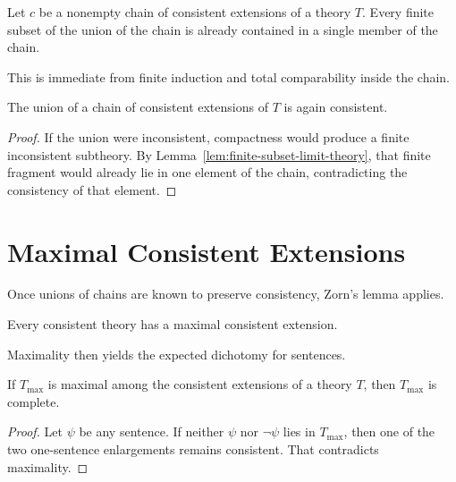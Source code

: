 \begin{lemma}
\label{lem:finite-subset-limit-theory}
Let $c$ be a nonempty chain of consistent extensions of a theory $T$. Every
finite subset of the union of the chain is already contained in a single member
of the chain.
\end{lemma}

This is immediate from finite induction and total comparability inside the
chain.

\begin{proposition}
\label{prop:consis-limit}
The union of a chain of consistent extensions of $T$ is again consistent.
\end{proposition}

\begin{proof}
If the union were inconsistent, compactness would produce a finite inconsistent
subtheory. By Lemma~\ref{lem:finite-subset-limit-theory}, that finite fragment
would already lie in one element of the chain, contradicting the consistency of
that element.
\end{proof}

\section{Maximal Consistent Extensions}

Once unions of chains are known to preserve consistency, Zorn's lemma applies.

\begin{theorem}
\label{thm:maximal-extension}
Every consistent theory has a maximal consistent extension.
\end{theorem}

Maximality then yields the expected dichotomy for sentences.

\begin{proposition}
\label{prop:maximal-is-complete}
If $T_{\max}$ is maximal among the consistent extensions of a theory $T$, then
$T_{\max}$ is complete.
\end{proposition}

\begin{proof}
Let $\psi$ be any sentence. If neither $\psi$ nor $\neg \psi$ lies in
$T_{\max}$, then one of the two one-sentence enlargements remains consistent.
That contradicts maximality.
\end{proof}


